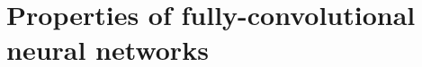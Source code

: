 \documentclass[xcolor=pdftex,dvipsnames,table,mathserif]{beamer}
\begin{document}















\section[Properties]{Properties of fully-convolutional neural networks}
\end{document}
